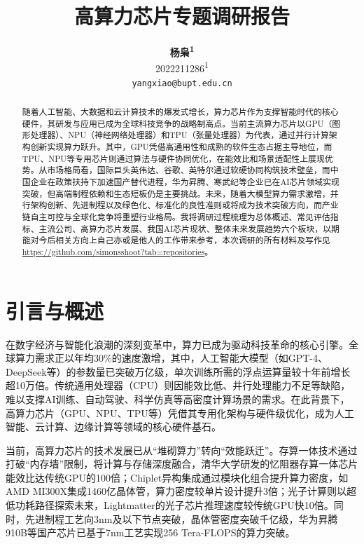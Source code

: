 \documentclass{article}
\title{高算力芯片专题调研报告}
\author{%
  \textbf{杨枭\textsuperscript{1}} 
 \\
  2022211286\textsuperscript{1} 
  \\
  \texttt{yangxiao@bupt.edu.cn} 
}
\begin{document}
  
\maketitle
\begin{abstract}
  随着人工智能、大数据和云计算技术的爆发式增长，算力芯片作为支撑智能时代的核心硬件，其研发与应用已成为全球科技竞争的战略制高点\cite{hager2010introduction}。当前主流算力芯片以GPU（图形处理器）、NPU（神经网络处理器）和TPU（张量处理器）为代表，通过并行计算架构创新实现算力跃升\cite{hager2016exploring}。其中，GPU凭借高通用性和成熟的软件生态占据主导地位，而TPU、NPU等专用芯片则通过算法与硬件协同优化，在能效比和场景适配性上展现优势。从市场格局看，国际巨头英伟达、谷歌、英特尔通过软硬协同构筑技术壁垒，而中国企业在政策扶持下加速国产替代进程，华为昇腾、寒武纪等企业已在AI芯片领域实现突破，但高端制程依赖和生态短板仍是主要挑战。未来，随着大模型算力需求激增，并行架构创新、先进制程以及绿色化、标准化的良性准则或将成为技术突破方向，而产业链自主可控与全球化竞争将重塑行业格局。我将调研过程梳理为总体概述、常见评估指标、主流公司、高算力芯片发展、我国AI芯片现状、整体未来发展趋势六个板块，以期能对今后相关方向上自己亦或是他人的工作带来参考，本次调研的所有材料及写作见\url{https://github.com/simonsshoot?tab=repositories}。
\end{abstract}

\section{引言与概述}
在数字经济与智能化浪潮的深刻变革中，算力已成为驱动科技革命的核心引擎\cite{yao2022high}。全球算力需求正以年均30\%的速度激增，其中，人工智能大模型（如GPT-4\cite{achiam2023gpt}、DeepSeek\cite{liu2024deepseek}等）的参数量已突破万亿级，单次训练所需的浮点运算量较十年前增长超10万倍。传统通用处理器（CPU）则因能效比低、并行处理能力不足等缺陷，难以支撑AI训练、自动驾驶、科学仿真等高密度计算场景的需求\cite{hager2016exploring}。在此背景下，高算力芯片（GPU、NPU、TPU等）凭借其专用化架构与硬件级优化，成为人工智能、云计算、边缘计算等领域的核心硬件基石。

当前，高算力芯片的技术发展已从“堆砌算力”转向“效能跃迁”。存算一体技术通过打破“内存墙”限制\cite{melnyk2016parallel}，将计算与存储深度融合，清华大学研发的忆阻器存算一体芯片能效比达传统GPU的100倍；Chiplet异构集成通过模块化组合提升算力密度，如AMD MI300X集成1460亿晶体管，算力密度较单片设计提升3倍\cite{shan2022architecture,naffziger2020amdchiplet,narashiman2024chiplets}；光子计算则以超低功耗路径探索未来，Lightmatter的光子芯片推理速度较传统GPU快10倍。同时，先进制程工艺向3nm及以下节点突破，晶体管密度突破千亿级，华为昇腾910B等国产芯片已基于7nm工艺实现256 Tera-FLOPS的算力突破\cite{lee2024huawei}。
\end{document}

